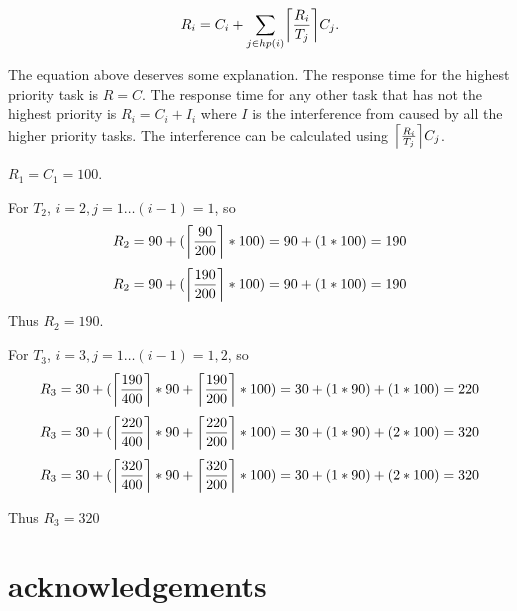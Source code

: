 \documentclass[10pt]{article}
\DeclarePairedDelimiter\ceil{\lceil}{\rceil}
\begin{document}
\begin{equation}
    R_i = C_i + \sum_{j \in hp(i)}^{} \ceil*{\frac{R_i}{T_j}}C_j.
\end{equation}

The equation above deserves some explanation.
The response time for the highest priority task is $R = C$.
The response time for any other task that has not the highest priority is $R_i = C_i + I_i$ where $I$ is the interference from caused by all the higher priority tasks.
The interference can be calculated using $\ceil*{\frac{R_i}{T_j}}C_j$.

$R_1 = C_1 = 100$.

For $T_2$, $i=2, j=1\dots (i-1) = 1$, so
\begin{equation}
    R_2 = 90 + (\ceil*{\frac{90}{200}} * 100) = 90 + (1 * 100) = 190
\end{equation}
\begin{equation}
    R_2 = 90 + (\ceil*{\frac{190}{200}} * 100) = 90 + (1 * 100) = 190
\end{equation}
Thus $R_2 = 190$.

For $T_3$, $i=3, j=1\dots (i-1) = 1,2$, so
\begin{equation}
    R_3 = 30 + (\ceil*{\frac{190}{400}} * 90 + \ceil*{\frac{190}{200}} * 100) = 30 + (1 * 90) + (1 * 100) = 220 
\end{equation}
\begin{equation}
    R_3 = 30 + (\ceil*{\frac{220}{400}} * 90 + \ceil*{\frac{220}{200}} * 100) = 30 + (1 * 90) + (2 * 100) = 320 
\end{equation}
\begin{equation}
    R_3 = 30 + (\ceil*{\frac{320}{400}} * 90 + \ceil*{\frac{320}{200}} * 100) = 30 + (1 * 90) + (2 * 100) = 320 
\end{equation}

Thus $R_3 = 320$

\section*{acknowledgements}
\end{document}

